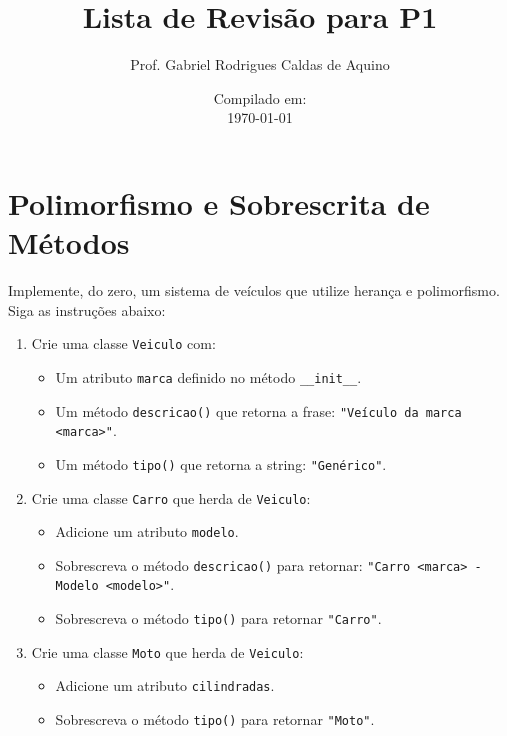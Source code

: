 \title{Lista de Revisão para P1}
\author{Prof. Gabriel Rodrigues Caldas de Aquino}
\date{Compilado em: \\ \today}



\maketitle

\section{Polimorfismo e Sobrescrita de Métodos}
Implemente, do zero, um sistema de veículos que utilize herança e polimorfismo.  
Siga as instruções abaixo:

\begin{enumerate}
    \item Crie uma classe \texttt{Veiculo} com:
    \begin{itemize}
        \item Um atributo \texttt{marca} definido no método \texttt{\_\_init\_\_}.
        \item Um método \texttt{descricao()} que retorna a frase: \texttt{"Veículo da marca <marca>"}.
        \item Um método \texttt{tipo()} que retorna a string: \texttt{"Genérico"}.
    \end{itemize}

    \item Crie uma classe \texttt{Carro} que herda de \texttt{Veiculo}:
    \begin{itemize}
        \item Adicione um atributo \texttt{modelo}.
        \item Sobrescreva o método \texttt{descricao()} para retornar: \texttt{"Carro <marca> - Modelo <modelo>"}.
        \item Sobrescreva o método \texttt{tipo()} para retornar \texttt{"Carro"}.
    \end{itemize}

    \item Crie uma classe \texttt{Moto} que herda de \texttt{Veiculo}:
    \begin{itemize}
        \item Adicione um atributo \texttt{cilindradas}.
        \item Sobrescreva o método \texttt{tipo()} para retornar \texttt{"Moto"}.
    \end{itemize}


\end{enumerate}
